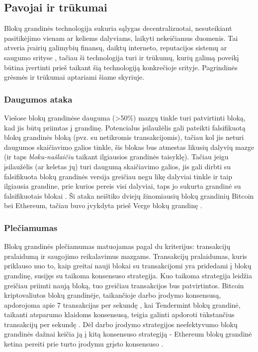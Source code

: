 \subsection{Pavojai ir trūkumai} \label{blockchain:concerns}

Blokų grandinės technologija sukuria sąlygas decentralizuotai, nesuteikiant pasitikėjimo vienam ar keliems dalyviams, laikyti nekeičiamus duomenis.
Tai atveria įvairių galimybių finansų, daiktų interneto, reputacijos sistemų ar saugumo srityse \cite{Zheng2017}, tačiau ši technologija turi ir trūkumų,
kurių galimą poveikį būtina įvertinti prieš taikant šią technologiją konkrečioje srityje. Pagrindinės grėsmės ir trūkumai aptariami šiame skyriuje.

\subsubsection{Daugumos ataka}

Viešose blokų grandinėse dauguma (>50\%) mazgų tinkle turi patvirtinti bloką, kad jis būtų priimtas į grandinę. Potencialus įsilaužėlis gali pateikti
falsifikuotą blokų grandinės bloką (pvz. su netikromis transakcijomis), tačiau kol jis neturi daugumos skaičiavimo galios tinkle, šis blokas bus
atmestas likusių dalyvių mazge (ir taps \textit{bloku-našlaičiu} taikant ilgiausios grandinės taisyklę). Tačiau jeigu įsilaužėlis (ar keletas jų)
turi daugumą skaičiavimo galios, jis gali dirbti su falsifikuota blokų grandinės versija greičiau negu likę dalyviai tinkle ir taip ilgiausia grandine, prie kurios
pereis visi dalyviai, taps jo sukurta grandinė su falsifikuotais blokai \cite{Zheng2017}. Ši ataka neištiko dviejų žinomiausių blokų grandinių Bitcoin bei Ethereum, tačiau
buvo įvykdyta prieš Verge blokų grandinę \cite{Sedgwick2018}.

\subsubsection{Plečiamumas}

Blokų grandinės plečiamumas matuojamas pagal du kriterijus: transakcijų pralaidumą ir saugojimo reikalavimus mazgams. Transakcijų pralaidumas, kuris priklauso nuo to,
kaip greitai nauji blokai su transakcijomi yra pridedami į blokų grandinę, susijęs su taikoma konsensuso strategija.
Kuo taikoma strategija leidžia greičiau priimti naują bloką, tuo greičiau transakcijos bus patvirtintos. Bitcoin kriptovaliutos blokų grandinėje, taikančioje darbo įrodymo konsensusą,
apdorojoma apie 7 transakcijas per sekundę \cite{Zheng2017}, kai Tendermint blokų grandinė, taikanti
atsparumo klaidoms konsensusą, teigia galinti apdoroti tūkstančius transakcijų per sekundę \cite{Tendermint2017}. Dėl darbo įrodymo strategijos neefektyvumo
blokų grandinės dažnai keičia ją į kitą konsensuso strategiją - Ethereum blokų grandinė ketina pereiti prie turto įrodymu grįsto konsensuso \cite{Ethereum}.


